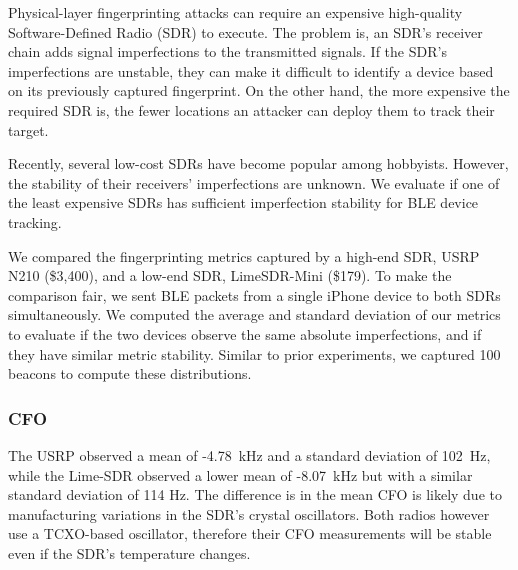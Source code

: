Physical-layer fingerprinting attacks can require an expensive high-quality
Software-Defined Radio (SDR) to execute. The problem is, an SDR's receiver
chain adds signal imperfections to the transmitted signals. If the SDR's
imperfections are unstable, they can make it difficult to identify a device
based on its previously captured fingerprint. On the other hand, the more expensive the required SDR is, the fewer locations an attacker can
deploy them to track their target. 

Recently, several low-cost SDRs have
become popular among hobbyists. However, the stability of their receivers'
imperfections are unknown. We evaluate if one of the least expensive SDRs has
sufficient imperfection stability for BLE device tracking.

We compared the fingerprinting metrics captured by a high-end SDR, USRP N210 (\$3,400), and a low-end SDR, LimeSDR-Mini (\$179).
To make the comparison fair, we sent BLE packets from a single iPhone device to both SDRs simultaneously.
We computed the average and standard deviation of
our metrics to evaluate if the two devices observe the same absolute imperfections, and if they have similar metric stability.
Similar to prior experiments, we captured 100 beacons to compute these
distributions.

\subsubsection*{CFO} The USRP observed a mean of -4.78~kHz and a standard
deviation of 102~Hz, while the Lime-SDR observed a lower mean of -8.07~kHz
but with a similar standard deviation of 114 Hz. The difference is in the mean CFO is likely due
to manufacturing variations in the SDR's crystal oscillators. Both radios
however use a TCXO-based oscillator, therefore their CFO measurements will be stable even if the SDR's temperature changes.

